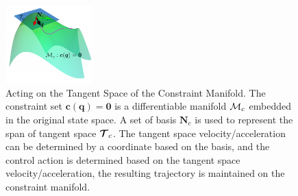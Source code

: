 \begin{figure}[H]
    \centering
    \includegraphics[width=0.3\textwidth]{Images/constraint_manifold.png}
    \caption[ATACOM]{
        Acting on the Tangent Space of the Constraint Manifold. The constraint set $\bm{c}(\bm{q}) = \bm{0}$ is a differentiable manifold
        $\mathcal{M}_c$ embedded in the original state space. A set of basis $\bm{N}_c$ is used to represent the span of tangent space $\bm{\mathcal{T}}_c$.
        The tangent space velocity/acceleration can be determined by a coordinate based on the basis, and the control action is determined based on the tangent
        space velocity/acceleration, the resulting trajectory is maintained on the constraint manifold.
        }
    \label{fig:constraint_manifold}
\end{figure}




